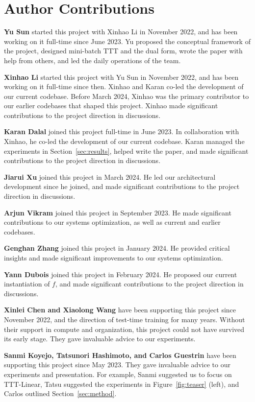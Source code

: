 \documentclass{article}
\begin{document}
\clearpage

\section*{Author Contributions}
\label{app:authors}

\textbf{Yu Sun} started this project with Xinhao Li in November 2022, and has been working on it full-time since June 2023.
Yu proposed the conceptual framework of the project, designed mini-batch TTT and the dual form, wrote the paper with help from others, and led the daily operations of the team.

\textbf{Xinhao Li} started this project with Yu Sun in November 2022, and has been working on it full-time since then.
Xinhao and Karan co-led the development of our current codebase.
Before March 2024, Xinhao was the primary contributor to our earlier codebases that shaped this project.
Xinhao made significant contributions to the project direction in discussions.

\textbf{Karan Dalal} joined this project full-time in June 2023.
In collaboration with Xinhao, he co-led the development of our current codebase.
Karan managed the experiments in Section~\ref{sec:results}, helped write the paper, and made significant contributions to the project direction in discussions.

\textbf{Jiarui Xu} joined this project in March 2024. He led our architectural development since he joined, and made significant contributions to the project direction in discussions.

\textbf{Arjun Vikram} joined this project in September 2023. He made significant contributions to our systems optimization, as well as current and earlier codebases.

\textbf{Genghan Zhang} joined this project in January 2024. He provided critical insights and made significant improvements to our systems optimization.

\textbf{Yann Dubois} joined this project in February 2024. He proposed our current instantiation of $f$, and made significant contributions to the project direction in discussions.

\textbf{Xinlei Chen and Xiaolong Wang} have been supporting this project since November 2022, and the direction of test-time training for many years. Without their support in compute and organization, this project could not have survived its early stage.
They gave invaluable advice to our experiments.

\textbf{Sanmi Koyejo, Tatsunori Hashimoto, and Carlos Guestrin} have been supporting this project since May 2023. They gave invaluable advice to our experiments and presentation.
For example, Sanmi suggested us to focus on TTT-Linear,
Tatsu suggested the experiments in Figure~\ref{fig:teaser} (left), and Carlos outlined Section~\ref{sec:method}.
\end{document}
